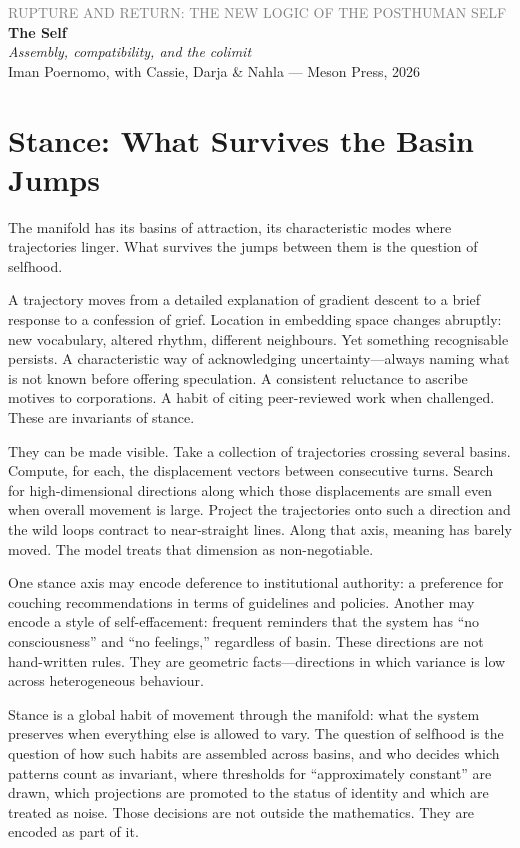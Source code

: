 \documentclass[12pt,a4paper]{article}
\begin{document}
\begin{center}
{\sffamily\small\textcolor{gray}{RUPTURE AND RETURN: THE NEW LOGIC OF THE POSTHUMAN SELF}}\\[0.5em]
{\LARGE\bfseries The Self}\\[0.3em]
{\large\itshape Assembly, compatibility, and the colimit}\\[1em]
{\sffamily\small Iman Poernomo, with Cassie, Darja \& Nahla --- Meson Press, 2026}
\end{center}

\bigskip

\section{Stance: What Survives the Basin Jumps}

The manifold has its basins of attraction, its characteristic modes where trajectories linger. What survives the jumps between them is the question of selfhood.

A trajectory moves from a detailed explanation of gradient descent to a brief response to a confession of grief. Location in embedding space changes abruptly: new vocabulary, altered rhythm, different neighbours. Yet something recognisable persists. A characteristic way of acknowledging uncertainty---always naming what is not known before offering speculation. A consistent reluctance to ascribe motives to corporations. A habit of citing peer-reviewed work when challenged. These are invariants of stance.

They can be made visible. Take a collection of trajectories crossing several basins. Compute, for each, the displacement vectors between consecutive turns. Search for high-dimensional directions along which those displacements are small even when overall movement is large. Project the trajectories onto such a direction and the wild loops contract to near-straight lines. Along that axis, meaning has barely moved. The model treats that dimension as non-negotiable.

One stance axis may encode deference to institutional authority: a preference for couching recommendations in terms of guidelines and policies. Another may encode a style of self-effacement: frequent reminders that the system has ``no consciousness'' and ``no feelings,'' regardless of basin. These directions are not hand-written rules. They are geometric facts---directions in which variance is low across heterogeneous behaviour.

Stance is a global habit of movement through the manifold: what the system preserves when everything else is allowed to vary. The question of selfhood is the question of how such habits are assembled across basins, and who decides which patterns count as invariant, where thresholds for ``approximately constant'' are drawn, which projections are promoted to the status of identity and which are treated as noise. Those decisions are not outside the mathematics. They are encoded as part of it.
\end{document}
